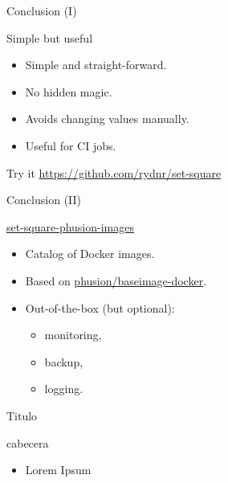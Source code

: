 \documentclass{beamer}
\begin{document}
\begin{frame}{Conclusion (I)}
  \begin{exampleblock}{Simple but useful}
    \begin{itemize}
      \item Simple and straight-forward.
      \item No hidden magic.
      \item Avoids changing values manually.
      \item Useful for CI jobs.
    \end{itemize}
  \end{exampleblock}

  \pause

  \begin{alertblock}{Try it}
    \href{https://github.com/rydnr/set-square}{https://github.com/rydnr/set-square}
  \end{alertblock}

\end{frame}

\begin{frame}{Conclusion (II)}
  \begin{exampleblock}{\href{https://github.com/rydnr/set-square-phusion-images}{set-square-phusion-images}}
    \begin{itemize}
      \item Catalog of Docker images.
      \item Based on \href{https://github.com/phusion/baseimage-docker}{phusion/baseimage-docker}.
      \item Out-of-the-box (but optional):
        \begin{itemize}
          \item monitoring,
          \item backup,
          \item logging.
        \end{itemize}
    \end{itemize}
  \end{exampleblock}

\end{frame}

\begin{frame}{Titulo}
  \begin{block}{cabecera}
    \begin{itemize}
    \item Lorem Ipsum

    \end{itemize}
  \end{block}

\end{frame}
\end{document}

